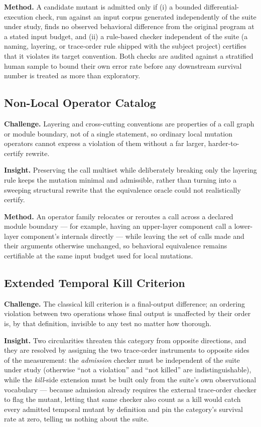 \documentclass[11pt]{article}
\begin{document}
\textbf{Method.} A candidate mutant is admitted only if (i) a bounded differential-execution check, run against an input corpus generated independently of the suite under study, finds no observed behavioral difference from the original program at a stated input budget, and (ii) a rule-based checker independent of the suite (a naming, layering, or trace-order rule shipped with the subject project) certifies that it violates its target convention. Both checks are audited against a stratified human sample to bound their own error rate before any downstream survival number is treated as more than exploratory.

\subsection{Non-Local Operator Catalog}
\textbf{Challenge.} Layering and cross-cutting conventions are properties of a call graph or module boundary, not of a single statement, so ordinary local mutation operators cannot express a violation of them without a far larger, harder-to-certify rewrite.

\textbf{Insight.} Preserving the call multiset while deliberately breaking only the layering rule keeps the mutation minimal and admissible, rather than turning into a sweeping structural rewrite that the equivalence oracle could not realistically certify.

\textbf{Method.} An operator family relocates or reroutes a call across a declared module boundary --- for example, having an upper-layer component call a lower-layer component's internals directly --- while leaving the set of calls made and their arguments otherwise unchanged, so behavioral equivalence remains certifiable at the same input budget used for local mutations.

\subsection{Extended Temporal Kill Criterion}
\textbf{Challenge.} The classical kill criterion is a final-output difference; an ordering violation between two operations whose final output is unaffected by their order is, by that definition, invisible to any test no matter how thorough.

\textbf{Insight.} Two circularities threaten this category from opposite directions, and they are resolved by assigning the two trace-order instruments to opposite sides of the measurement: the \emph{admission} checker must be independent of the suite under study (otherwise ``not a violation'' and ``not killed'' are indistinguishable), while the \emph{kill}-side extension must be built only from the suite's own observational vocabulary --- because admission already requires the external trace-order checker to flag the mutant, letting that same checker also count as a kill would catch every admitted temporal mutant by definition and pin the category's survival rate at zero, telling us nothing about the suite.
\end{document}
